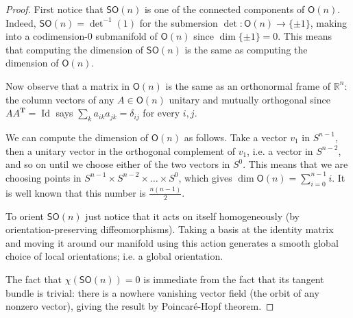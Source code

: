 \begin{proof}\leavevmode
	First notice that \(\mathsf{SO}(n)\) is one of the connected components of \(\mathsf{O}(n)\). Indeed, \(\mathsf{SO}(n)=\det^{-1}(1)\) for the submersion \(\det:\mathsf{O}(n)\to \{\pm 1\}\), making into a codimension-0 submanifold of  \(\mathsf{O}(n)\) since \(\dim \{\pm 1\}=0\). This means that computing the dimension of \(\mathsf{SO}(n)\) is the same as computing the dimension of \(\mathsf{O}(n)\).

	Now observe that a matrix in \(\mathsf{O}(n)\) is the same as an orthonormal frame of \(\mathbb{R}^n\): the column vectors of any  \(A \in \mathsf{O}(n)\) unitary and mutually orthogonal since \(A A ^{\mathbf{T}}=\operatorname{Id}\) says \(\sum_{k}a_{ik}a_{jk}=\delta_{ij}\) for every \(i,j\). 

	We can compute the dimension of \(\mathsf{O}(n)\) as follows. Take a vector \(v_1\) in \(S^{n-1}\), then a unitary vector in the orthogonal complement of  \(v_1\), i.e. a vector in \(S^{n-2}\), and so on until we choose either of the two vectors in \(S^0\). This means that we are choosing points in \(S^{n-1}\times S^{n-2} \times \ldots \times S^0\), which gives \(\dim \mathsf{O}(n)=\sum_{i=0}^{n-1}i\). It is well known that this number is \(\frac{n(n-1)}{2}\).

	To orient \(\mathsf{SO}(n)\) just notice that it acts on itself homogeneously (by orientation-preserving diffeomorphisms). Taking a basis at the identity matrix and moving it around our manifold using this action generates a smooth global choice of local orientations; i.e. a global orientation.

	The fact that \(\chi(\mathsf{SO}(n))=0\) is immediate from the fact that its tangent bundle is trivial: there is a nowhere vanishing vector field (the orbit of any nonzero vector), giving the result by Poincaré-Hopf theorem.

\end{proof}

